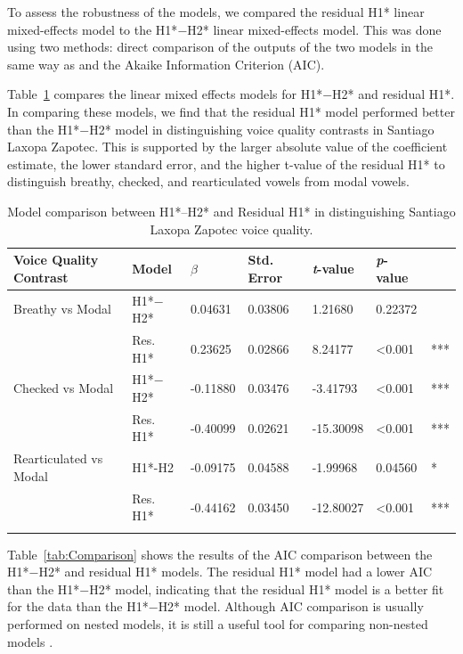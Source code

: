 To assess the robustness of the models, we compared the residual H1* linear mixed-effects model to the H1*$-$H2* linear mixed-effects model. This was done using two methods: direct comparison of the outputs of the two models in the same way as \citet{chaiH1H2Acoustic2022} and the Akaike Information Criterion (AIC). 

Table~\ref{tab:CGComparison} compares the linear mixed effects models for H1*$-$H2* and residual H1*. In comparing these models, we find that the residual H1* model performed better than the H1*$-$H2* model in distinguishing voice quality contrasts in Santiago Laxopa Zapotec. This is supported by the larger absolute value of the coefficient estimate, the lower standard error, and the higher t-value of the residual H1* to distinguish breathy, checked, and rearticulated vowels from modal vowels.

\begin{table}[!h]
  \centering
  \caption{Model comparison between H1*$–$H2* and Residual H1* in distinguishing Santiago Laxopa Zapotec voice quality.}
  \label{tab:CGComparison}
    \begin{tabular}{lllllll}
      \lsptoprule
    Voice Quality Contrast & Model & \textit{$\beta$ } & Std. Error & \textit{t}-value & \textit{p}-value  &     \\
    \hline
      Breathy vs Modal &  H1*$-$H2* & 0.04631 & 0.03806  & 1.21680 & 0.22372 & \\
      & Res. H1* & 0.23625 & 0.02866 & 8.24177   & \textless 0.001   & *** \\
      Checked vs Modal & H1*$-$H2* & -0.11880 & 0.03476 & -3.41793  & \textless 0.001 & *** \\
      & Res. H1* & -0.40099 & 0.02621 & -15.30098 & \textless 0.001 & *** \\
      Rearticulated vs Modal & H1*-H2 & -0.09175 & 0.04588 & -1.99968 & 0.04560 & *  \\
     & Res. H1* & -0.44162 & 0.03450 & -12.80027 & \textless 0.001 & *** \\
     \lspbottomrule
    \end{tabular}
\end{table}

Table~\ref{tab:Comparison} shows the results of the AIC comparison between the H1*$-$H2* and residual H1* models. The residual H1* model had a lower AIC than the H1*$-$H2* model, indicating that the residual H1* model is a better fit for the data than the H1*$-$H2* model. Although AIC comparison is usually performed on nested models, it is still a useful tool for comparing non-nested models \citep{burnhamMultimodelInferenceUnderstanding2004,burnhamAICModelSelection2011,burnhamModelSelectionMultimodel2004}.

